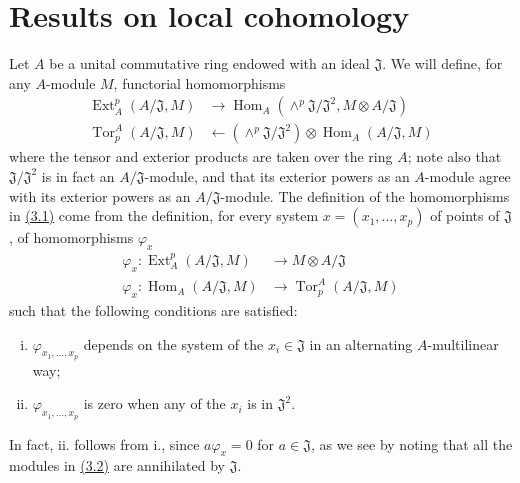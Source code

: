\documentclass{article}
\newcommand{\from}{\leftarrow}
\DeclareMathOperator{\Ext}{Ext}
\DeclareMathOperator{\Hom}{Hom}
\DeclareMathOperator{\Tor}{Tor}
\newcommand{\oldpage}[1]{\marginpar{\footnotesize$\Big\vert$ \textit{p.~#1}}}
\begin{document}
\section{Results on local cohomology}
\label{section3}

Let $A$ be a unital commutative ring endowed with an ideal $\mathfrak{J}$.
We will define, for any $A$-module $M$, functorial homomorphisms
\[
\label{3.1}
  \begin{aligned}
    \Ext_A^p(A/\mathfrak{J},M) &\to \Hom_A(\wedge^p\mathfrak{J}/\mathfrak{J}^2,M\otimes A/\mathfrak{J})
  \\\Tor_p^A(A/\mathfrak{J},M) &\from (\wedge^p\mathfrak{J}/\mathfrak{J}^2)\otimes\Hom_A(A/\mathfrak{J},M)
  \end{aligned}
\tag{3.1}
\]
where the tensor and exterior products are taken over the ring $A$;
note also that $\mathfrak{J}/\mathfrak{J}^2$ is in fact an $A/\mathfrak{J}$-module, and that its exterior powers as an $A$-module agree with its exterior powers as an $A/\mathfrak{J}$-module.
The definition of the homomorphisms in \hyperref[3.1]{(3.1)} come from the definition, for every system $x=(x_1,\ldots,x_p)$ of points of $\mathfrak{J}$, of homomorphisms $\varphi_x$
\[
\label{3.2}
  \begin{aligned}
    \varphi_x\colon \Ext_A^p(A/\mathfrak{J},M) &\to M\otimes A/\mathfrak{J}
  \\\varphi_x\colon \Hom_A(A/\mathfrak{J},M) &\to \Tor_p^A(A/\mathfrak{J},M)
  \end{aligned}
\tag{3.2}
\]
such that the following conditions are satisfied:
\oldpage{149-06}
\begin{enumerate}[i.]
  \item $\varphi_{x_1,\ldots,x_p}$ depends on the system of the $x_i\in\mathfrak{J}$ in an alternating $A$-multilinear way;
  \item $\varphi_{x_1,\ldots,x_p}$ is zero when any of the $x_i$ is in $\mathfrak{J}^2$.
\end{enumerate}

In fact, ii. follows from i., since $a\varphi_x=0$ for $a\in\mathfrak{J}$, as we see by noting that all the modules in \hyperref[3.2]{(3.2)} are annihilated by $\mathfrak{J}$.
\end{document}
